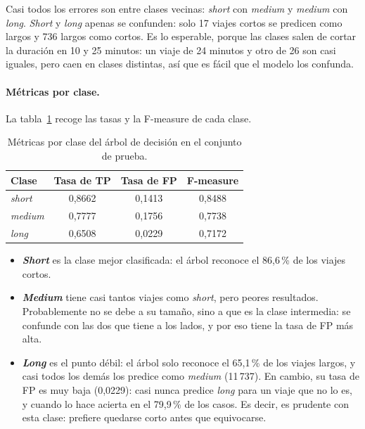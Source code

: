 \documentclass[12pt,a4paper]{article}
\begin{document}
Casi todos los errores son entre clases vecinas: \textit{short} con
\textit{medium} y \textit{medium} con \textit{long}. \textit{Short} y
\textit{long} apenas se confunden: solo 17 viajes cortos se predicen como
largos y 736 largos como cortos. Es lo esperable, porque las clases salen de cortar la duración en 10 y
25 minutos: un viaje de 24 minutos y otro de 26 son casi iguales, pero caen
en clases distintas, así que es fácil que el modelo los confunda.
  
\paragraph{Métricas por clase.} La tabla~\ref{tab:metricas-dt} recoge las
tasas y la F-measure de cada clase.

\begin{table}[H]
\centering
\small
\begin{tabular}{lccc}
\toprule
\textbf{Clase} & \textbf{Tasa de \acs{TP}} & \textbf{Tasa de \acs{FP}} & \textbf{F-measure} \\
\midrule
\textit{short}  & 0,8662 & 0,1413 & 0,8488 \\
\textit{medium} & 0,7777 & 0,1756 & 0,7738 \\
\textit{long}   & 0,6508 & 0,0229 & 0,7172 \\
\bottomrule
\end{tabular}
\caption{Métricas por clase del árbol de decisión en el conjunto de prueba.}
\label{tab:metricas-dt}
\end{table}
 
\begin{itemize}
    \item \textbf{\textit{Short}} es la clase mejor clasificada: el árbol
    reconoce el 86,6\,\% de los viajes cortos.
    \item \textbf{\textit{Medium}} tiene casi tantos viajes como
    \textit{short}, pero peores resultados. Probablemente no se debe a su tamaño, sino a
    que es la clase intermedia: se confunde con las dos que tiene a los
    lados, y por eso tiene la tasa de \acs{FP} más alta.
    \item \textbf{\textit{Long}} es el punto débil: el árbol solo reconoce
    el 65,1\,\% de los viajes largos, y casi todos los demás los predice
    como \textit{medium} (11\,737). En cambio, su tasa de \acs{FP} es muy
    baja (0,0229): casi nunca predice \textit{long} para un viaje que no lo
    es, y cuando lo hace acierta en el 79,9\,\% de los casos. Es decir, es
    prudente con esta clase: prefiere quedarse corto antes que equivocarse.
\end{itemize}
 
\end{document}
